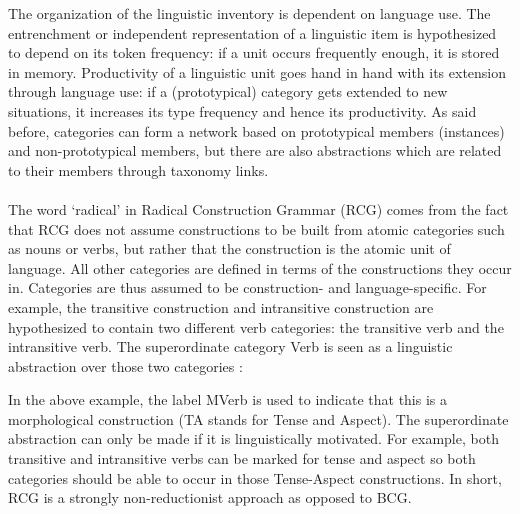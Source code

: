 The organization of the linguistic inventory is dependent on language use. The entrenchment or independent representation of a linguistic item is hypothesized to depend on its token frequency: if a unit occurs frequently enough, it is stored in memory. Productivity of a linguistic unit goes hand in hand with its extension through language use: if a (prototypical) category gets extended to new situations, it increases its type frequency and hence its productivity. As said before, categories can form a network based on prototypical members (instances) and non-prototypical members, but there are also abstractions which are related to their members through taxonomy links.
\\
\\
 The word `radical' in Radical Construction Grammar (RCG) comes from the fact that RCG does not assume constructions to be built from atomic categories such as nouns or verbs, but rather that the construction is the atomic unit of language. All other categories are defined in terms of the constructions they occur in. Categories are thus assumed to be construction- and language-specific. For example, the transitive construction and intransitive construction are hypothesized to contain two different verb categories: the transitive verb and the intransitive verb. The superordinate category Verb is seen as a linguistic abstraction over those two categories \citep[p. 287--288]{croft04cognitive}:

\ea
{}
\z

In the above example, the label MVerb is used to indicate that this is a morphological construction (TA stands for Tense and Aspect). The superordinate abstraction can only be made if it is linguistically motivated. For example, both transitive and intransitive verbs can be marked for tense and aspect so both categories should be able to occur in those Tense-Aspect constructions. In short, RCG is a strongly non-reductionist approach as opposed to BCG.

